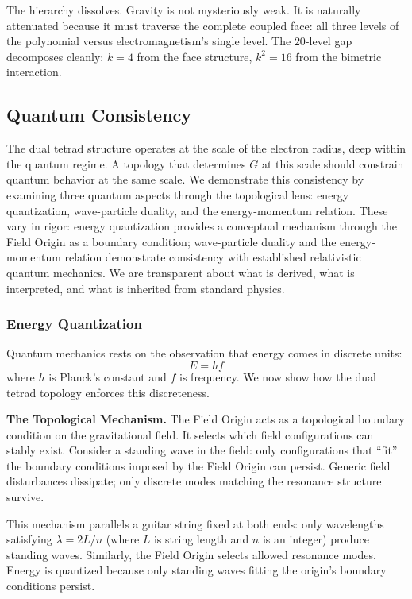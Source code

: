 \documentclass[aps,prd,preprint,superscriptaddress,showpacs,preprintnumbers,amsmath,amssymb,nofootinbib]{revtex4-2}
\begin{document}
The hierarchy dissolves. Gravity is not mysteriously weak. It is naturally attenuated because it must traverse the complete coupled face: all three levels of the polynomial versus electromagnetism's single level. The $20$-level gap decomposes cleanly: $k = 4$ from the face structure, $k^2 = 16$ from the bimetric interaction.

\subsection{Quantum Consistency}
\label{subsec:quantum}

The dual tetrad structure operates at the scale of the electron radius, deep within the quantum regime. A topology that determines $G$ at this scale should constrain quantum behavior at the same scale. We demonstrate this consistency by examining three quantum aspects through the topological lens: energy quantization, wave-particle duality, and the energy-momentum relation. These vary in rigor: energy quantization provides a conceptual mechanism through the Field Origin as a boundary condition; wave-particle duality and the energy-momentum relation demonstrate consistency with established relativistic quantum mechanics. We are transparent about what is derived, what is interpreted, and what is inherited from standard physics.

\subsubsection*{Energy Quantization}

Quantum mechanics rests on the observation that energy comes in discrete units:
\begin{equation}
E = hf
\label{eq:energy_quantization}
\end{equation}
where $h$ is Planck's constant and $f$ is frequency. We now show how the dual tetrad topology enforces this discreteness.

\textbf{The Topological Mechanism.}
The Field Origin acts as a topological boundary condition on the gravitational field. It selects which field configurations can stably exist. Consider a standing wave in the field: only configurations that ``fit'' the boundary conditions imposed by the Field Origin can persist. Generic field disturbances dissipate; only discrete modes matching the resonance structure survive.

This mechanism parallels a guitar string fixed at both ends: only wavelengths satisfying $\lambda = 2L/n$ (where $L$ is string length and $n$ is an integer) produce standing waves. Similarly, the Field Origin selects allowed resonance modes. Energy is quantized because only standing waves fitting the origin's boundary conditions persist.
\end{document}

